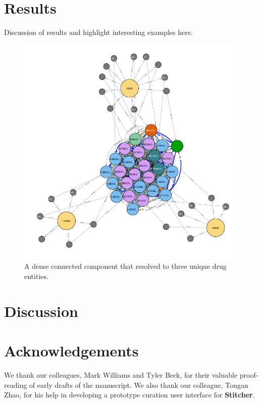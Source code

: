 \documentclass{bioinfo}
\newcommand\st{\textbf{Stitcher}}
\begin{document}
\section{Results}
Discussion of results and highlight interesting examples here.

\begin{figure}[!tpb]
\centerline{\includegraphics[scale=0.5]{graph4-crop}}
\caption{A dense connected component that resolved to three unique
drug entities.}\label{fig:graph2}  
\end{figure}

\section{Discussion}

\section*{Acknowledgements}
We thank our colleagues, Mark Williams and Tyler Beck, for their
valuable proof-reading of early drafts of the manuscript. We also
thank our colleague, Tongan Zhao, for his help in developing a
prototype curation user interface for \st.


%
%
%
%
%
%
%

\end{document}
